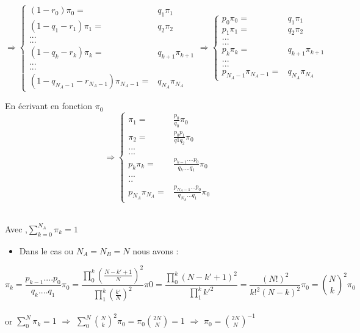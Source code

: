 \documentclass[11pt,]{article}
\providecommand{\tightlist}{%
  \setlength{\itemsep}{0pt}\setlength{\parskip}{0pt}}
\begin{document}
\[
  \Rightarrow \left\{
  \begin{array}{rcr}
  (1-r_0)\pi_0=&q_1\pi_1\\
  (1-q_1-r_1)\pi_1=&q_2\pi_2\\
  ...&\\
  ...&\\
  (1-q_k-r_k)\pi_k=&q_{k+1}\pi_{k+1}\\
    ...&\\
  ...&\\
  (1-q_{N_A-1}-r_{N_A-1})\pi_{N_A-1}=&q_{N_A}\pi_{N_A}
  \end{array}
  \right.
  \Rightarrow \left\{ \begin{array}{rcr}
  p_0\pi_0=&q_1\pi_1\\
  p_1\pi_1=&q_2\pi_2\\
  ...&\\
  ...&\\
  p_k\pi_k=&q_{k+1}\pi_{k+1}\\
    ...&\\
  ...&\\
  p_{N_A-1}\pi_{N_A-1}=&q_{N_A}\pi_{N_A}
  \end{array}
  \right.
  \]

En écrivant en fonction \(\pi_0\) \[ 
\Rightarrow \left\{ \begin{array}{rcr}
  \pi_1=&\frac{p_0}{q_0}\pi_0\\
  \pi_2=&\frac{p_0p_1}{q1q_2}\pi_0\\
  ...&\\
  ...&\\
  p_k\pi_k=&\frac{p_{k-1}....p_0}{q_{k}....q_1}\pi_0\\
    ...&\\
  ..&\\
  p_{N_A}\pi_{N_A}=&\frac{p_{N_A-1}...p_0}{q_{N_A}...q_1}\pi_{0}
  \end{array}
  \right. 
  \]\\

\begin{center}
 Avec ,$ \sum_{k=0}^{N_A} \pi_k=1$
  \end{center}

\begin{itemize}
\tightlist
\item
  Dans le cas ou \(N_A=N_B=N\) nous avons :
\end{itemize}

\[\pi_k=\frac{p_{k-1}....p_0}{q_{k}....q_1}\pi_0=\frac{\prod_0^k(\frac{N-k'+1}{N})^2}{\prod_1^k(\frac{k'}{N})^2}\pi0=\frac{\prod_0^k(N-k'+1)^2}{\prod_1^k k'^2}=\frac{(N!)^2}{k!^2(N-k)^2}\pi_0=\binom{N}{k}^2\pi_0
\]\\
or \(\sum_0^N\pi_k=1\) \(\Rightarrow\)
\(\sum_0^N\binom{N}{k}^2\pi_0=\pi_0 \binom{2N}{N}=1\) \(\Rightarrow\)
\(\pi_0=\binom{2N}{N}^{-1}\)
\end{document}
